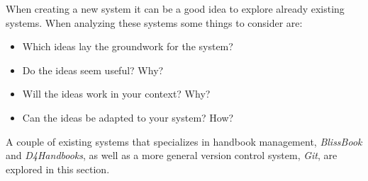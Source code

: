 When creating a new system it can be a good idea to explore already existing systems.%
 When analyzing these systems some things to consider are:

\begin{itemize}
  \item Which ideas lay the groundwork for the system?
  \item Do the ideas seem useful? Why?
  \item Will the ideas work in your context? Why?
  \item Can the ideas be adapted to your system? How?
\end{itemize}


A couple of existing systems that specializes in handbook management, \textit{BlissBook} and \textit{D4Handbooks}, as well as a more general version control system, \textit{Git}, are explored in this section.
